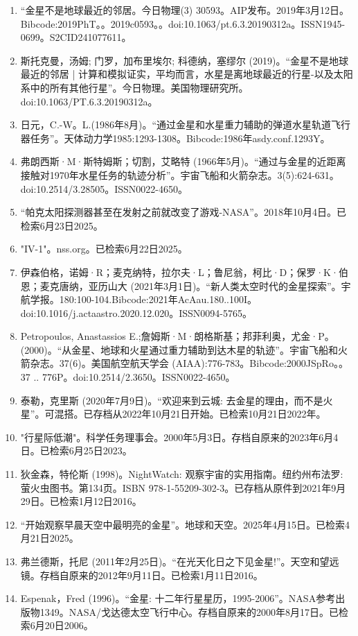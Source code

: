 \begin{enumerate}
\item “金星不是地球最近的邻居。今日物理(3) 30593。AIP发布。2019年3月12日。Bibcode:2019PhT。。2019c0593。。doi:10.1063/pt.6.3.20190312a。ISSN1945-0699。S2CID241077611。  
\item 斯托克曼，汤姆; 门罗，加布里埃尔; 科德纳，塞缪尔 (2019)。“金星不是地球最近的邻居 | 计算和模拟证实，平均而言，水星是离地球最近的行星-以及太阳系中的所有其他行星”。今日物理。美国物理研究所。doi:10.1063/PT.6.3.20190312a。
\item 日元，C.-W。L.(1986年8月)。“通过金星和水星重力辅助的弹道水星轨道飞行器任务”。天体动力学1985:1293-1308。Bibcode:1986年asdy.conf.1293Y。
\item 弗朗西斯·M·斯特姆斯；切割，艾略特 (1966年5月)。“通过与金星的近距离接触对1970年水星任务的轨迹分析”。宇宙飞船和火箭杂志。3(5):624-631。doi:10.2514/3.28505。ISSN0022-4650。 
\item “帕克太阳探测器甚至在发射之前就改变了游戏-NASA”。2018年10月4日。已检索6月23日2025。
\item "IV-1"。nss.org。已检索6月22日2025。
\item 伊森伯格，诺姆·R；麦克纳特，拉尔夫·L；鲁尼翁，柯比·D；保罗·K·伯恩；麦克唐纳，亚历山大 (2021年3月1日)。“新人类太空时代的金星探索”。宇航学报。180:100-104.Bibcode:2021年AcAau.180..100I。doi:10.1016/j.actaastro.2020.12.020。ISSN0094-5765。 
\item Petropoulos, Anastassios E.;詹姆斯·M·朗格斯基；邦菲利奥，尤金·P。(2000)。“从金星、地球和火星通过重力辅助到达木星的轨迹”。宇宙飞船和火箭杂志。37(6)。美国航空航天学会 (AIAA):776-783。Bibcode:2000JSpRo。。37 .. 776P。doi:10.2514/2.3650。ISSN0022-4650。 
\item 泰勒，克里斯 (2020年7月9日)。“欢迎来到云城: 去金星的理由，而不是火星”。可混搭。已存档从2022年10月21日开始。已检索10月21日2022年。
\item "行星际低潮"。科学任务理事会。2000年5月3日。存档自原来的2023年6月4日。已检索6月25日2023。
\item 狄金森，特伦斯 (1998)。NightWatch: 观察宇宙的实用指南。纽约州布法罗: 萤火虫图书。第134页。ISBN 978-1-55209-302-3。已存档从原件到2021年9月29日。已检索1月12日2016。
\item “开始观察早晨天空中最明亮的金星”。地球和天空。2025年4月15日。已检索4月21日2025。
\item 弗兰德斯，托尼 (2011年2月25日)。“在光天化日之下见金星!”。天空和望远镜。存档自原来的2012年9月11日。已检索1月11日2016。
\item Espenak，Fred (1996)。“金星: 十二年行星星历，1995-2006”。NASA参考出版物1349。NASA/戈达德太空飞行中心。存档自原来的2000年8月17日。已检索6月20日2006。

\end{enumerate}

